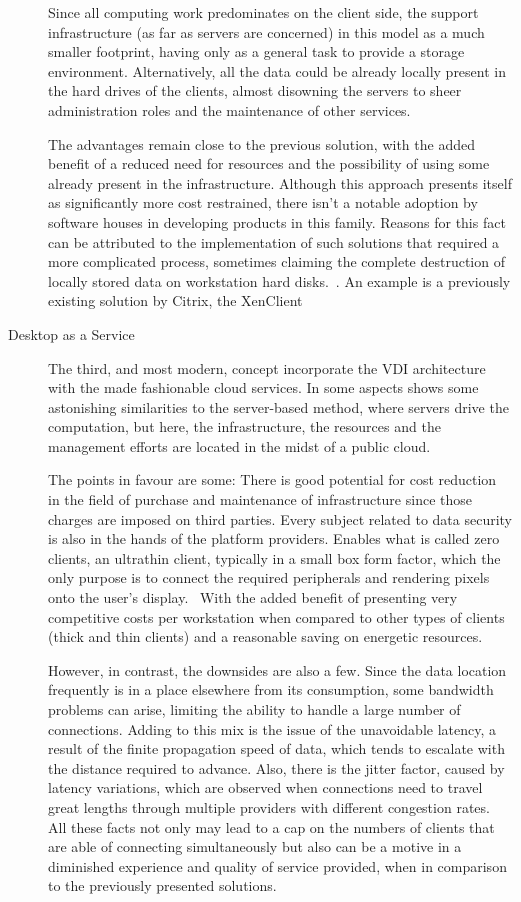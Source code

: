 \begin{description}
		Since all computing work predominates on the client side, the support infrastructure (as far as servers are concerned) in this model as a much smaller footprint, having only as a general task to provide a storage environment. Alternatively, all the data could be already locally present in the hard drives of the clients, almost disowning the servers to sheer administration roles and the maintenance of other services.

		The advantages remain close to the previous solution, with the added benefit of a reduced need for resources and the possibility of using some already present in the infrastructure. Although this approach presents itself as significantly more cost restrained, there isn't a notable adoption by software houses in developing products in this family. Reasons for this fact can be attributed to the implementation of such solutions that required a more complicated process, sometimes claiming the complete destruction of locally stored data on workstation hard disks.~\cite{VMblog_Citrix}. An example is a previously existing solution by Citrix, the XenClient~\cite{Citrix_XenDesktop}
	\item [Desktop as a Service] The third, and most modern, concept incorporate the VDI architecture with the made fashionable cloud services. In some aspects shows some astonishing similarities to the server-based method, where servers drive the computation, but here, the infrastructure, the resources and the management efforts are located in the midst of a public cloud.

		The points in favour are some: There is good potential for cost reduction in the field of purchase and maintenance of infrastructure since those charges are imposed on third parties. Every subject related to data security is also in the hands of the platform providers. Enables what is called zero clients, an ultrathin client, typically in a small box form factor, which the only purpose is to connect the required peripherals and rendering pixels onto the user’s display.~\cite{VMWare_Zikmund2014} With the added benefit of presenting very competitive costs per workstation when compared to other types of clients (thick and thin clients) and a reasonable saving on energetic resources.

		However, in contrast, the downsides are also a few. Since the data location frequently is in a place elsewhere from its consumption, some bandwidth problems can arise, limiting the ability to handle a large number of connections. Adding to this mix is the issue of the unavoidable latency, a result of the finite propagation speed of data, which tends to escalate with the distance required to advance. Also, there is the jitter factor, caused by latency variations, which are observed when connections need to travel great lengths through multiple providers with different congestion rates. All these facts not only may lead to a cap on the numbers of clients that are able of connecting simultaneously but also can be a motive in a diminished experience and quality of service provided, when in comparison to the previously presented solutions.
		

\end{description}
